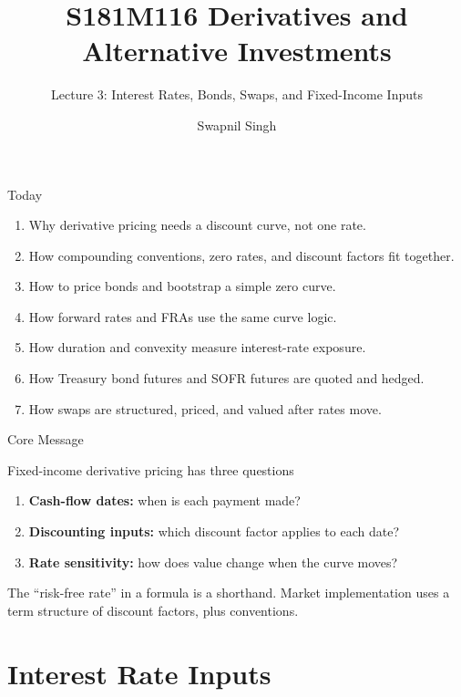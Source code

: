 \documentclass[aspectratio=169,11pt]{beamer}
\title{S181M116 Derivatives and Alternative Investments}
\subtitle{Lecture 3: Interest Rates, Bonds, Swaps, and Fixed-Income Inputs}
\author{Swapnil Singh}
\institute{Lietuvos Bankas and Kaunas University of Technology}
\date{}
\begin{document}
\begin{frame}
    \titlepage
\end{frame}

\begin{frame}{Today}
    \begin{enumerate}
        \item Why derivative pricing needs a discount curve, not one rate.
        \item How compounding conventions, zero rates, and discount factors fit together.
        \item How to price bonds and bootstrap a simple zero curve.
        \item How forward rates and FRAs use the same curve logic.
        \item How duration and convexity measure interest-rate exposure.
        \item How Treasury bond futures and SOFR futures are quoted and hedged.
        \item How swaps are structured, priced, and valued after rates move.
    \end{enumerate}
\end{frame}

\begin{frame}{Core Message}
    \begin{block}{Fixed-income derivative pricing has three questions}
        \begin{enumerate}
            \item \textbf{Cash-flow dates:} when is each payment made?
            \item \textbf{Discounting inputs:} which discount factor applies to each date?
            \item \textbf{Rate sensitivity:} how does value change when the curve moves?
        \end{enumerate}
    \end{block}

    \vspace{0.5em}
    The ``risk-free rate'' in a formula is a shorthand.
    Market implementation uses a term structure of discount factors, plus conventions.
\end{frame}

\section{Interest Rate Inputs}
\end{document}
